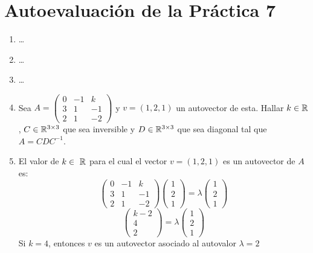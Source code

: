 \documentclass[../practica.root.tex]{subfiles}
\begin{document}
\section{Autoevaluación de la Práctica 7}

\begin{enumerate}
    \item[] \dots
    \item   \dots
    \item   \dots
    \item[] Sea $ A = \begin{pmatrix}
              0 & -1 & k  \\
              3 & 1  & -1 \\
              2 & 1  & -2
          \end{pmatrix} $ y $ v = (1,2,1) $ un autovector de esta. Hallar $ k \in \R $, $ C \in \mathbb{R}^{3\times3} $ que sea inversible y $ D \in \mathbb{R}^{3\times3} $ que sea diagonal tal que $ A = CDC^{-1} $.
    \item   El valor de $ k \in \R $ para el cual el vector $ v = (1,2,1) $ es un autovector de $ A $ es:
          \[
              \begin{pmatrix}
                  0 & -1 & k  \\
                  3 & 1  & -1 \\
                  2 & 1  & -2
              \end{pmatrix}
              \begin{pmatrix}
                  1 \\ 2 \\ 1
              \end{pmatrix}
              =
              \lambda
              \begin{pmatrix}
                  1 \\ 2 \\ 1
              \end{pmatrix}
          \] \[
              \begin{pmatrix}
                  k - 2 \\ 4 \\ 2
              \end{pmatrix}
              =
              \lambda
              \begin{pmatrix}
                  1 \\ 2 \\ 1
              \end{pmatrix}
          \]
          Si $ k = 4 $, entonces $ v $ es un autovector asociado al autovalor $ \lambda = 2 $

\end{enumerate}
\end{document}
